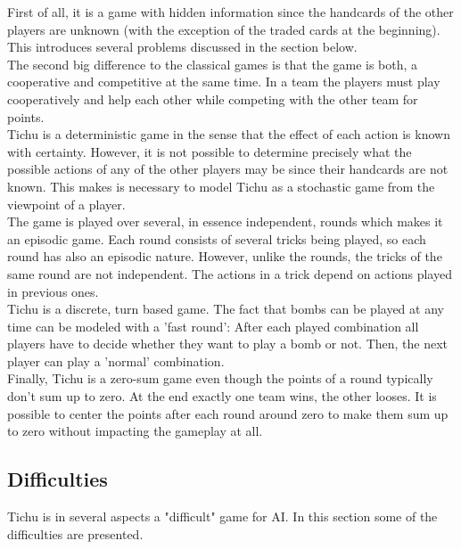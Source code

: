 First of all, it is a game with hidden information since the handcards of the other players are unknown (with the exception of the traded cards at the beginning). This introduces several problems discussed in the section \textit{} below.\\
The second big difference to the classical games is that the game is both, a cooperative and competitive at the same time. In a team the players must play cooperatively and help each other while competing with the other team for points.\\
Tichu is a deterministic game in the sense that the effect of each action is known with certainty. However, it is not possible to determine precisely what the possible actions of any of the other players may be since their handcards are not known. This makes is necessary to model Tichu as a stochastic game from the viewpoint of a player.\\
The game is played over several, in essence independent, rounds which makes it an episodic game. Each round consists of several tricks being played, so each round has also an episodic nature. However, unlike the rounds, the tricks of the same round are not independent. The actions in a trick depend on actions played in previous ones.\\
Tichu is a discrete, turn based game. The fact that bombs can be played at any time can be modeled with a 'fast round': After each played combination all players have to decide whether they want to play a bomb or not. Then, the next player can play a 'normal' combination.\\
Finally, Tichu is a zero-sum game even though the points of a round typically don't sum up to zero. At the end exactly one team wins, the other looses. It is possible to center the points after each round around zero to make them sum up to zero without impacting the gameplay at all.

\subsection{Difficulties}
 Tichu is in several aspects a "difficult" game for AI.
 In this section some of the difficulties are presented.

